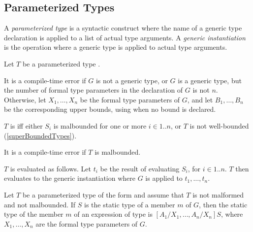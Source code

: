 \documentclass[makeidx]{article}
\begin{document}
{\subsection{Parameterized Types}


\LMHash{}%
A \emph{parameterized type} is a syntactic construct where the name of a generic type declaration is applied to a list of actual type arguments.
A \emph{generic instantiation} is the operation where a generic type is applied to actual type arguments.


\LMHash{}%
Let $T$ be a parameterized type .

\LMHash{}%
It is a compile-time error if $G$ is not a generic type,
or $G$ is a generic type, but the number of formal type parameters in the declaration of $G$ is not $n$.
Otherwise, let
$X_1, \ldots, X_n$
be the formal type parameters of $G$, and let
$B_1, \ldots, B_n$
be the corresponding upper bounds, using \DYNAMIC{} when no bound is declared.

\LMHash{}%
$T$ is  if{}f either
$S_i$ is malbounded for one or more $i \in 1 .. n$,
or $T$ is not well-bounded (\ref{superBoundedTypes}).

\LMHash{}%
It is a compile-time error if $T$ is malbounded.

\LMHash{}%
$T$ is evaluated as follows.
Let $t_i$ be the result of evaluating $S_i$, for $i \in 1 .. n$.
$T$ then evaluates to the generic instantiation where $G$ is applied to $t_1, \ldots, t_n$.

\LMHash{}%
Let $T$ be a parameterized type of the form
and assume that $T$ is not malformed and not malbounded.
If $S$ is the static type of a member $m$ of $G$,
then the static type of the member $m$ of an expression of type
is
$[A_1/X_1, \ldots, A_n/X_n]S$,
where $X_1, \ldots, X_n$ are the formal type parameters of $G$.

}
\end{document}
